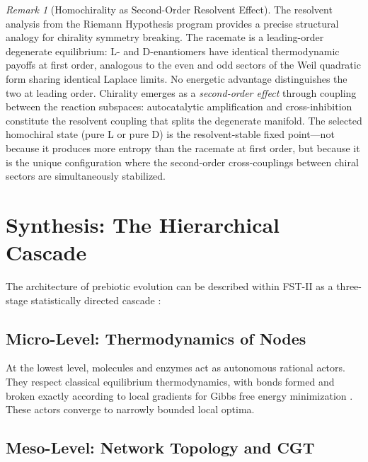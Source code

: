 \documentclass[12pt,a4paper]{article}
\theoremstyle{remark}
\newtheorem{remark}{Remark}
\begin{document}
\begin{remark}[Homochirality as Second-Order Resolvent Effect]
\label{rem:chirality-resolvent}
The resolvent analysis from the Riemann Hypothesis program \citep{GeigerRH2026b} provides a precise structural analogy for chirality symmetry breaking. The racemate is a leading-order degenerate equilibrium: L- and D-enantiomers have identical thermodynamic payoffs at first order, analogous to the even and odd sectors of the Weil quadratic form sharing identical Laplace limits. No energetic advantage distinguishes the two at leading order. Chirality emerges as a \emph{second-order effect} through coupling between the reaction subspaces: autocatalytic amplification and cross-inhibition constitute the resolvent coupling that splits the degenerate manifold. The selected homochiral state (pure L or pure D) is the resolvent-stable fixed point---not because it produces more entropy than the racemate at first order, but because it is the unique configuration where the second-order cross-couplings between chiral sectors are simultaneously stabilized.
\end{remark}

\section{Synthesis: The Hierarchical Cascade}
\label{sec:synthesis}

The architecture of prebiotic evolution can be described within FST-II as a three-stage statistically directed cascade \citep{ThermodynamicsLife}:

\subsection{Micro-Level: Thermodynamics of Nodes}

At the lowest level, molecules and enzymes act as autonomous rational actors. They respect classical equilibrium thermodynamics, with bonds formed and broken exactly according to local gradients for Gibbs free energy minimization \citep{MetabolicNash}. These actors converge to narrowly bounded local optima.

\subsection{Meso-Level: Network Topology and CGT}
\end{document}
